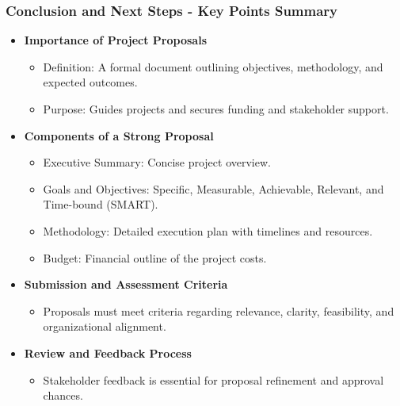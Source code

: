 \documentclass[aspectratio=169]{beamer}
\begin{document}
\begin{frame}[fragile]
    \frametitle{Conclusion and Next Steps - Key Points Summary}
    
    \begin{itemize}
        \item \textbf{Importance of Project Proposals}
        \begin{itemize}
            \item Definition: A formal document outlining objectives, methodology, and expected outcomes.
            \item Purpose: Guides projects and secures funding and stakeholder support.
        \end{itemize}
        
        \item \textbf{Components of a Strong Proposal}
        \begin{itemize}
            \item Executive Summary: Concise project overview.
            \item Goals and Objectives: Specific, Measurable, Achievable, Relevant, and Time-bound (SMART).
            \item Methodology: Detailed execution plan with timelines and resources.
            \item Budget: Financial outline of the project costs.
        \end{itemize}
        
        \item \textbf{Submission and Assessment Criteria}
        \begin{itemize}
            \item Proposals must meet criteria regarding relevance, clarity, feasibility, and organizational alignment.
        \end{itemize}
        
        \item \textbf{Review and Feedback Process}
        \begin{itemize}
            \item Stakeholder feedback is essential for proposal refinement and approval chances.
        \end{itemize}
    \end{itemize}
\end{frame}
\end{document}
